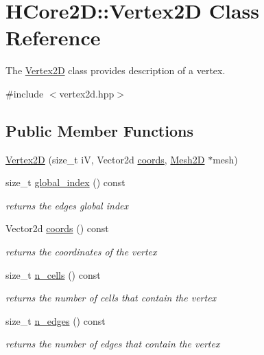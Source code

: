 \hypertarget{classHCore2D_1_1Vertex2D}{}\section{H\+Core2D\+:\+:Vertex2D Class Reference}
\label{classHCore2D_1_1Vertex2D}


The \hyperlink{classHCore2D_1_1Vertex2D}{Vertex2D} class provides description of a vertex.  




{\ttfamily \#include $<$vertex2d.\+hpp$>$}

\subsection*{Public Member Functions}
\begin{DoxyCompactItemize}
\item 
\hyperlink{classHCore2D_1_1Vertex2D_ae759dbca494a48ef69b92822ee1a29df}{Vertex2D} (size\+\_\+t iV, Vector2d \hyperlink{group__Mesh2D_ga5a32556d9d3efd85919e94443c4237ca}{coords}, \hyperlink{classHCore2D_1_1Mesh2D}{Mesh2D} $\ast$mesh)
\item 
size\+\_\+t \hyperlink{group__Mesh2D_gacd3879a55567a7d909607573c2833b15}{global\+\_\+index} () const
\begin{DoxyCompactList}\small\item\em returns the edges global index \end{DoxyCompactList}\item 
Vector2d \hyperlink{group__Mesh2D_ga5a32556d9d3efd85919e94443c4237ca}{coords} () const
\begin{DoxyCompactList}\small\item\em returns the coordinates of the vertex \end{DoxyCompactList}\item 
size\+\_\+t \hyperlink{group__Mesh2D_gafc8cf8e3ed4a59b2f1f8e1ef6e1a6700}{n\+\_\+cells} () const
\begin{DoxyCompactList}\small\item\em returns the number of cells that contain the vertex \end{DoxyCompactList}\item 
size\+\_\+t \hyperlink{group__Mesh2D_gace184166a1f2552aed79406812434140}{n\+\_\+edges} () const
\begin{DoxyCompactList}\small\item\em returns the number of edges that contain the vertex \end{DoxyCompactList}\item 

\end{DoxyCompactItemize}
